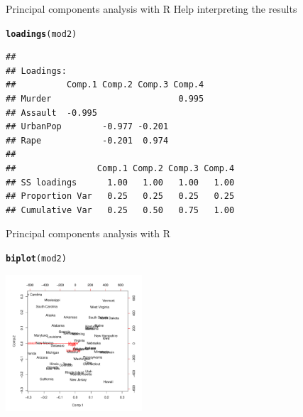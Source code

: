 \documentclass[10pt,xcolor=dvipsnames]{beamer}\usepackage[]{graphicx}\usepackage[]{color}
\makeatletter
\newcommand{\hlstd}[1]{\textcolor[rgb]{0.345,0.345,0.345}{#1}}%
\newcommand{\hlkwd}[1]{\textcolor[rgb]{0.737,0.353,0.396}{\textbf{#1}}}%
\newenvironment{kframe}{%
 \def\at@end@of@kframe{}%
 \ifinner\ifhmode%
  \def\at@end@of@kframe{\end{minipage}}%
  \begin{minipage}{\columnwidth}%
 \fi\fi%
 \def\FrameCommand##1{\hskip\@totalleftmargin \hskip-\fboxsep
 \colorbox{shadecolor}{##1}\hskip-\fboxsep
     \hskip-\linewidth \hskip-\@totalleftmargin \hskip\columnwidth}%
 \MakeFramed {\advance\hsize-\width
   \@totalleftmargin\z@ \linewidth\hsize
   \@setminipage}}%
 {\par\unskip\endMakeFramed%
 \at@end@of@kframe}
\newenvironment{knitrout}{}{} %
\makeatother
\begin{document}
\begin{frame}{Principal components analysis with R}
\noindent Help interpreting the results
\begin{knitrout}\footnotesize
{}\color{fgcolor}\begin{kframe}
\begin{alltt}
\hlkwd{loadings}\hlstd{(mod2)}
\end{alltt}
\begin{verbatim}
## 
## Loadings:
##          Comp.1 Comp.2 Comp.3 Comp.4
## Murder                         0.995
## Assault  -0.995                     
## UrbanPop        -0.977 -0.201       
## Rape            -0.201  0.974       
## 
##                Comp.1 Comp.2 Comp.3 Comp.4
## SS loadings      1.00   1.00   1.00   1.00
## Proportion Var   0.25   0.25   0.25   0.25
## Cumulative Var   0.25   0.50   0.75   1.00
\end{verbatim}
\end{kframe}
\end{knitrout}
\end{frame}


\begin{frame}{Principal components analysis with R}

\begin{knitrout}\footnotesize
{}\color{fgcolor}\begin{kframe}
\begin{alltt}
\hlkwd{biplot}\hlstd{(mod2)}
\end{alltt}
\end{kframe}

{\centering \includegraphics[width=2in]{figure/pcaPlot3-1} 

}



\end{knitrout}
\end{frame}
\end{document}

